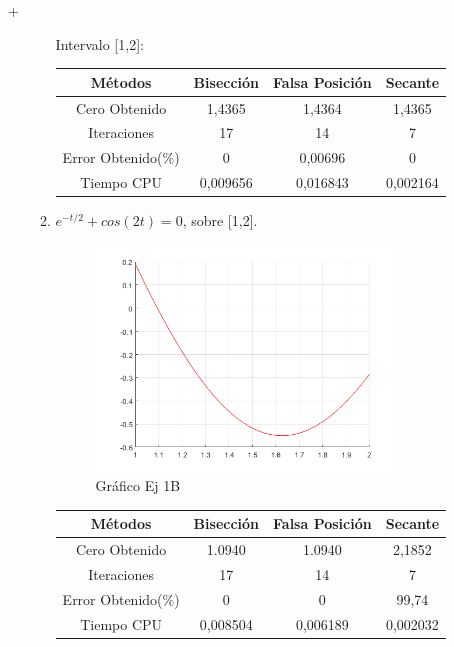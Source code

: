 +\documentclass{udpreport}
\begin{document}
\begin{enumerate}
\begin{enumerate}
        \begin{table}[H]Intervalo [1,2]:
        \centering
           \begin{tabular} { |c|c|c|c|}
                \hline
                Métodos       & Bisección & Falsa Posición & Secante  \\
                \hline
                Cero Obtenido &  1,4365       &    1,4364      &      1,4365   \\
                \hline
                Iteraciones   &    17        &    14     &       7        \\
                \hline
                Error Obtenido(\%) &       0      &       0,00696      &     0         \\
                \hline
                Tiempo CPU &       0,009656     &      0,016843    &     0,002164         \\
                 \hline
                \end{tabular}
            \end{table}
    
        
    \item \( e^{-t/2} +cos(2t) = 0 \), sobre [1,2].
    
        \begin{figure}[H]
            \centering
            \includegraphics[width=8cm]{ec2.png}
            \caption{Gráfico Ej 1B}
        \end{figure}
        
        \begin{table}[H]
        \centering
           \begin{tabular} { |c|c|c|c|}
                \hline
                Métodos       & Bisección & Falsa Posición & Secante  \\
                \hline
                Cero Obtenido &  1.0940      &    1.0940     &      2,1852   \\
                \hline
                Iteraciones   &    17        &    14     &      7        \\
                \hline
                Error Obtenido(\%) &       0      &       0      &     99,74         \\
                \hline
                Tiempo CPU &       0,008504     &      0,006189    &     0,002032         \\
                 \hline
                \end{tabular}
            \end{table}
      

\end{enumerate}
\end{enumerate}
\end{document}
